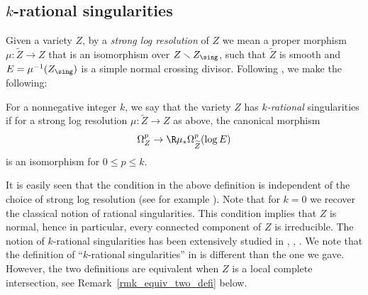 \subsection{$k$-rational singularities}\label{section_k_rational}
Given a variety $Z$, by a \emph{strong log resolution} of $Z$ we mean a proper morphism
$\mu\colon\widetilde{Z}\to Z$ that is an isomorphism over $Z\smallsetminus Z_\sing$, such that $\widetilde{Z}$ is smooth and
$E=\mu^{-1}(Z_\sing)$ is a simple normal crossing divisor.
Following \cite{FL2}, we make the following:

\begin{defi}
For a nonnegative integer $k$, we say that the variety $Z$ has
\emph{$k$\nobreakdash-ra\-tional} singularities if for a strong log resolution $\mu\colon\widetilde{Z}\to Z$ as above,
the canonical morphism\vspace*{-3pt}\enlargethispage{.5\baselineskip}
\begin{equation}\label{eq_def_k_rat}
\Omega_Z^p\to \R\mu_*\Omega^p_{\widetilde{Z}}(\log E)
\end{equation}
is an isomorphism for $0\leq p\leq k$.
\end{defi}

It is easily seen that the condition in the above definition is independent of the choice of strong log resolution (see for example \cite[Lem.\,1.6]{MP2}).
Note that for $k=0$ we recover the classical notion of rational singularities. This condition implies that $Z$ is normal, hence in particular,
every connected component of $Z$ is irreducible.
The notion of $k$-rational singularities has been extensively studied in \cite{FL2}, \cite{FL3}, \cite{MP2}.
We note that the definition of ``$k$-rational singularities'' in \cite{FL2} is different than the one we gave. However, the two definitions are equivalent
when $Z$ is a local complete intersection, see Remark~\ref{rmk_equiv_two_defi} below.

